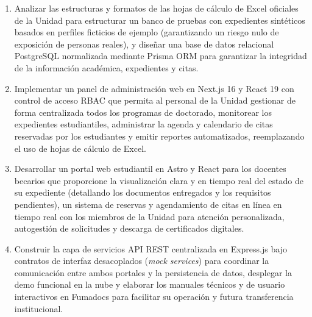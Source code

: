 \begin{enumerate}
    \item Analizar las estructuras y formatos de las hojas de cálculo de Excel oficiales de la Unidad para estructurar un banco de pruebas con expedientes sintéticos basados en perfiles ficticios de ejemplo (garantizando un riesgo nulo de exposición de personas reales), y diseñar una base de datos relacional PostgreSQL normalizada mediante Prisma ORM para garantizar la integridad de la información académica, expedientes y citas.
    \item Implementar un panel de administración web en Next.js 16 y React 19 con control de acceso RBAC que permita al personal de la Unidad gestionar de forma centralizada todos los programas de doctorado, monitorear los expedientes estudiantiles, administrar la agenda y calendario de citas reservadas por los estudiantes y emitir reportes automatizados, reemplazando el uso de hojas de cálculo de Excel.
    \item Desarrollar un portal web estudiantil en Astro y React para los docentes becarios que proporcione la visualización clara y en tiempo real del estado de su expediente (detallando los documentos entregados y los requisitos pendientes), un sistema de reservas y agendamiento de citas en línea en tiempo real con los miembros de la Unidad para atención personalizada, autogestión de solicitudes y descarga de certificados digitales.
    \item Construir la capa de servicios API REST centralizada en Express.js bajo contratos de interfaz desacoplados (\textit{mock services}) para coordinar la comunicación entre ambos portales y la persistencia de datos, desplegar la demo funcional en la nube y elaborar los manuales técnicos y de usuario interactivos en Fumadocs para facilitar su operación y futura transferencia institucional.
\end{enumerate}
